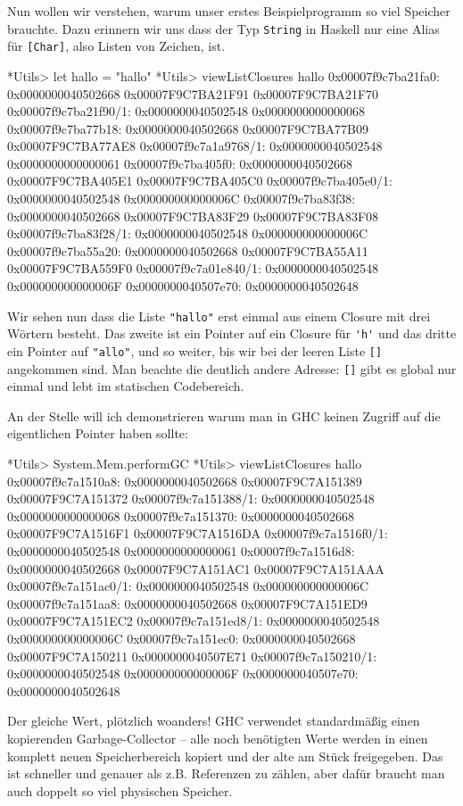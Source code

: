 \documentclass[11pt,DIV=12,parskip=half,headings=normal,abstract]{scrartcl}
\newcommand{\li}{\lstinline[style=haskell]}
\begin{document}
Nun wollen wir verstehen, warum unser erstes Beispielprogramm so viel Speicher brauchte. Dazu erinnern wir uns dass der Typ \li-String- in Haskell nur eine Alias für \li-[Char]-, also Listen von Zeichen, ist.
\begin{ghci}
*Utils> let hallo = "hallo"
*Utils> viewListClosures hallo
0x00007f9c7ba21fa0: 0x0000000040502668 0x00007F9C7BA21F91 0x00007F9C7BA21F70
0x00007f9c7ba21f90/1: 0x0000000040502548 0x0000000000000068
0x00007f9c7ba77b18: 0x0000000040502668 0x00007F9C7BA77B09 0x00007F9C7BA77AE8
0x00007f9c7a1a9768/1: 0x0000000040502548 0x0000000000000061
0x00007f9c7ba405f0: 0x0000000040502668 0x00007F9C7BA405E1 0x00007F9C7BA405C0
0x00007f9c7ba405e0/1: 0x0000000040502548 0x000000000000006C
0x00007f9c7ba83f38: 0x0000000040502668 0x00007F9C7BA83F29 0x00007F9C7BA83F08
0x00007f9c7ba83f28/1: 0x0000000040502548 0x000000000000006C
0x00007f9c7ba55a20: 0x0000000040502668 0x00007F9C7BA55A11 0x00007F9C7BA559F0
0x00007f9c7a01e840/1: 0x0000000040502548 0x000000000000006F
0x0000000040507e70: 0x0000000040502648
\end{ghci}
Wir sehen nun dass die Liste \li-"hallo"- erst einmal aus einem Closure mit drei Wörtern besteht. Das zweite ist ein Pointer auf ein Closure für \li-'h'- und das dritte ein Pointer auf \li-"allo"-, und so weiter, bis wir bei der leeren Liste \li-[]- angekommen sind. Man beachte die deutlich andere Adresse: \li-[]- gibt es global nur einmal und lebt im statischen Codebereich.

An der Stelle will ich demonstrieren warum man in GHC keinen Zugriff auf die eigentlichen Pointer haben sollte:
\begin{ghci}
*Utils> System.Mem.performGC
*Utils> viewListClosures hallo
0x00007f9c7a1510a8: 0x0000000040502668 0x00007F9C7A151389 0x00007F9C7A151372
0x00007f9c7a151388/1: 0x0000000040502548 0x0000000000000068
0x00007f9c7a151370: 0x0000000040502668 0x00007F9C7A1516F1 0x00007F9C7A1516DA
0x00007f9c7a1516f0/1: 0x0000000040502548 0x0000000000000061
0x00007f9c7a1516d8: 0x0000000040502668 0x00007F9C7A151AC1 0x00007F9C7A151AAA
0x00007f9c7a151ac0/1: 0x0000000040502548 0x000000000000006C
0x00007f9c7a151aa8: 0x0000000040502668 0x00007F9C7A151ED9 0x00007F9C7A151EC2
0x00007f9c7a151ed8/1: 0x0000000040502548 0x000000000000006C
0x00007f9c7a151ec0: 0x0000000040502668 0x00007F9C7A150211 0x0000000040507E71
0x00007f9c7a150210/1: 0x0000000040502548 0x000000000000006F
0x0000000040507e70: 0x0000000040502648
\end{ghci}

Der gleiche Wert, plötzlich woanders! GHC verwendet standardmäßig einen kopierenden Garbage-Collector – alle noch benötigten Werte werden in einen komplett neuen Speicherbereich kopiert und der alte am Stück freigegeben. Das ist schneller und genauer als z.B. Referenzen zu zählen, aber dafür braucht man auch doppelt so viel physischen Speicher.
\end{document}
